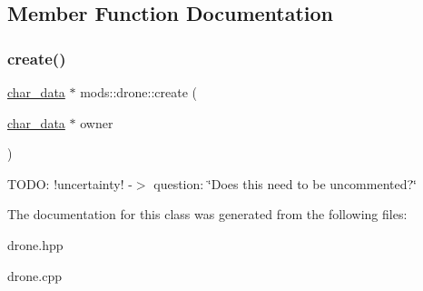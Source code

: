 \subsection{Member Function Documentation}
\mbox{\label{classmods_1_1drone_abad575cd5461c6bc20e089f940c4999e}} 
\subsubsection{\texorpdfstring{create()}{create()}}
{\footnotesize\ttfamily \hyperlink{structchar__data}{char\+\_\+data} $\ast$ mods\+::drone\+::create (\begin{DoxyParamCaption}\item[{\hyperlink{structchar__data}{char\+\_\+data} $\ast$}]{owner }\end{DoxyParamCaption})\hspace{0.3cm}{\ttfamily [static]}}

T\+O\+DO\+: !uncertainty! -\/$>$ question\+: \char`\"{}\+Does this need to be uncommented?\char`\"{} 

The documentation for this class was generated from the following files\+:\begin{DoxyCompactItemize}
\item 
drone.\+hpp\item 
drone.\+cpp\end{DoxyCompactItemize}
